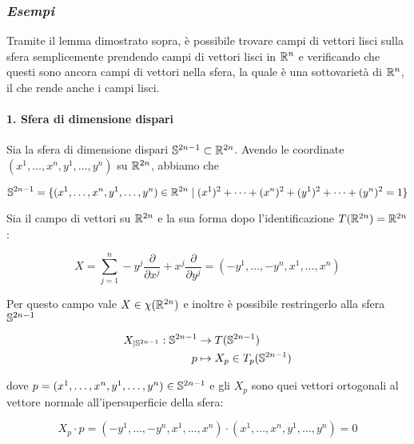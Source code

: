 \subsubsection{\textit{Esempi}}

Tramite il lemma dimostrato sopra, è possibile trovare campi di vettori lisci sulla sfera semplicemente prendendo campi di vettori lisci in $ \R^{n} $ e verificando che questi sono ancora campi di vettori nella sfera, la quale è una sottovarietà di $ \R^{n} $, il che rende anche i campi lisci.

\paragraph{1. Sfera di dimensione dispari}

Sia la sfera di dimensione dispari $ \S^{2n-1} \subset \R^{2n} $. Avendo le coordinate $ (x^{1},\dots,x^{n},y^{1},\dots,y^{n}) $ su $ \R^{2n} $, abbiamo che

\begin{equation}
	\S^{2n-1} = \{ (x^{1},\dots,x^{n},y^{1},\dots,y^{n}) \in \R^{2n} \mid (x^{1})^{2} + \cdots + (x^{n})^{2} + (y^{1})^{2} + \cdots + (y^{n})^{2} = 1 \}
\end{equation}

Sia il campo di vettori su $ \R^{2n} $ e la sua forma dopo l'identificazione $ T(\R^{2n}) = \R^{2n} $:

\begin{equation}
	X = \sum_{j=1}^{n} - y^{j} \dfrac{\partial}{\partial x^{j}} + x^{j} \dfrac{\partial}{\partial y^{j}} = (-y^{1},\dots,-y^{n},x^{1},\dots,x^{n})
\end{equation}

Per questo campo vale $ X \in \chi(\R^{2n}) $ e inoltre è possibile restringerlo alla sfera $ \S^{2n-1} $

\begin{align}
	\begin{split}
		X_{|\S^{2n-1}} : \S^{2n-1} &\to T(\S^{2n-1})\\
		p &\mapsto X_{p} \in T_{p}(\S^{2n-1})
	\end{split}
\end{align}

dove $ p = (x^{1},\dots,x^{n},y^{1},\dots,y^{n}) \in \S^{2n-1} $ e gli $ X_{p} $ sono quei vettori ortogonali al vettore normale all'ipersuperficie della sfera:

\begin{equation}
	X_{p} \cdot p = (-y^{1},\dots,-y^{n},x^{1},\dots,x^{n}) \cdot (x^{1},\dots,x^{n},y^{1},\dots,y^{n}) = 0
\end{equation}

